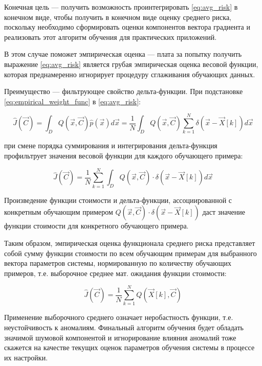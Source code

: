 \documentclass{article}
\numberwithin{equation}{subsection}
\begin{document}
Конечная цель --- получить возможность проинтегрировать \ref{eq:avg_risk} в конечном 
виде, чтобы получить в конечном виде оценку среднего риска, поскольку
необходимо сформировать оценки компонентов вектора градиента и реализовать этот 
алгоритм обучения для практических приложений. 

В этом случае поможет эмпирическая оценка --- плата за попытку 
получить выражение \ref{eq:avg_risk} является грубая эмпирическая 
оценка весовой функции, которая преднамеренно игнорирует процедуру
сглаживания обучающих данных.

Преимущество --- фильтрующее свойство дельта-функции. При подстановке \ref{eq:empirical_weight_func}
в \ref{eq:avg_risk}:

\begin{equation}
    \hat{J}(\vec{C}) = \int_{D} Q(\vec{x}, \vec{C}) \hat{p}(\vec{x}) d\vec{x}
    = \dfrac{1}{N} \int_{D} Q(\vec{x}, \vec{C}) \sum_{k=1}^{N} \delta(\vec{x} - 
    \vec{X}[k]) d\vec{x}
\end{equation}

\noindent
при смене порядка суммирования и интегрирования дельта-функция \glqq профильтрует \grqq
значения весовой функции для каждого обучающего примера:

\begin{equation}
    \hat{J}(\vec{C}) = \dfrac{1}{N} \sum_{k=1}^{N} \int_{D} 
    Q(\vec{x}, \vec{C}) \cdot \delta(\vec{x} - \vec{X}[k]) d\vec{x}
\end{equation}

Произведение функции стоимости и дельта-функции, ассоциированной с конкретным обучающим
примером $Q(\vec{x}, \vec{C}) \cdot \delta(\vec{x} - \vec{X}[k])$ даст значение функции
стоимости для конкретного обучающего примера.

Таким образом, эмпирическая оценка функционала среднего риска представляет собой сумму
функции стоимости по всем обучающим примерам для выбранного вектора параметров системы,
нормированную по количеству обучающих примеров, т.е. выборочное среднее мат. ожидания
функции стоимости:

\begin{equation}
    \hat{J}(\vec{C}) = \dfrac{1}{N} \sum_{k=1}^{N} Q(\vec{X}[k], \vec{C})
\end{equation}

Применение выборочного среднего означает неробастность функции, т.е. неустойчивость
к аномалиям. Финальный алгоритм обучения будет обладать значимой шумовой компонентой 
и игнорирование влияния аномалий тоже скажется на качестве текущих оценок параметров 
обучения системы в процессе их настройки.
\end{document}
